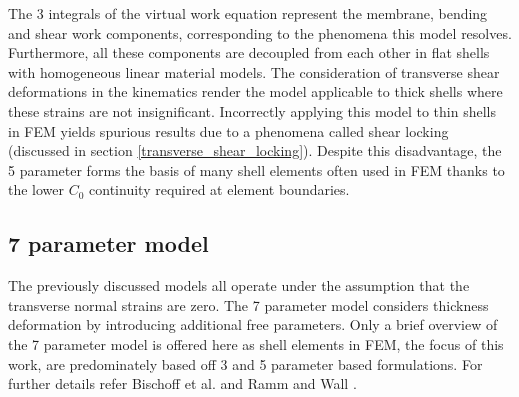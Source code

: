 
The 3 integrals of the virtual work equation represent the membrane, bending and shear work components, corresponding to the phenomena this model resolves. Furthermore, all these components are decoupled from each other in flat shells with homogeneous linear material models. The consideration of transverse shear deformations in the kinematics render the model applicable to thick shells where these strains are not insignificant. Incorrectly applying this model to thin shells in FEM yields spurious results due to a phenomena called shear locking (discussed in section \ref{transverse_shear_locking}). Despite this disadvantage, the 5 parameter forms the basis of many shell elements often used in FEM thanks to the lower $C_0$ continuity required at element boundaries.

\subsection{7 parameter model}

The previously discussed models all operate under the assumption that the transverse normal strains are zero. The 7 parameter model considers thickness deformation by introducing additional free parameters. Only a brief overview of the 7 parameter model is offered here as shell elements in FEM, the focus of this work, are predominately based off 3 and 5 parameter based formulations. For further details refer Bischoff et al. \cite{BischLitBook04} and Ramm and Wall \cite{RammLitBook04}.

